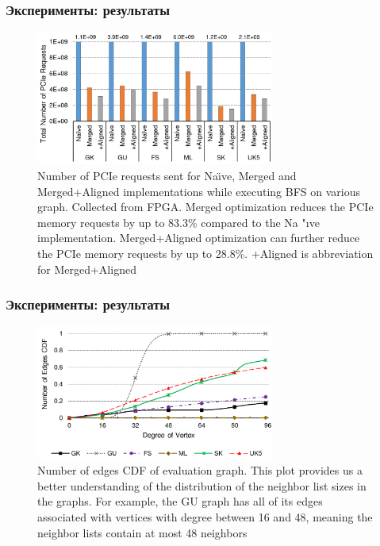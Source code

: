 \documentclass[xcolor=table,english]{beamer}
\begin{document}
\begin{frame}[fragile] \frametitle{Эксперименты: результаты}
     \begin{center}
    \begin{minipage}[m]{0.95\linewidth}
        \begin{figure}
            \centering
            \includegraphics[width=0.7\textwidth]{figures/num_of_requests.png}
            \caption{Number of PCIe requests sent for Na\"{\i}ve, Merged and Merged+Aligned implementations while executing BFS on various graph. Collected from FPGA. Merged optimization reduces the PCIe memory requests by up to 83.3\% compared to the Na
            "{\i}ve implementation. Merged+Aligned optimization can further reduce the PCIe memory requests by up to 28.8\%. +Aligned is abbreviation for Merged+Aligned}
        \end{figure}
    \end{minipage}\hfill
    \end{center}
\end{frame}

\begin{frame}[fragile] \frametitle{Эксперименты: результаты}
     \begin{center}
    \begin{minipage}[m]{0.95\linewidth}
        \begin{figure}
            \centering
            \includegraphics[width=0.7\textwidth]{figures/cdf.png}
            \caption{Number of edges CDF of evaluation graph. This plot provides us a better understanding of the distribution of the neighbor list sizes in the graphs. For example, the GU graph has all of its edges associated with vertices with degree between 16 and 48, meaning the neighbor lists contain at most 48 neighbors}
        \end{figure}
    \end{minipage}\hfill
    \end{center}
\end{frame}
\end{document}
